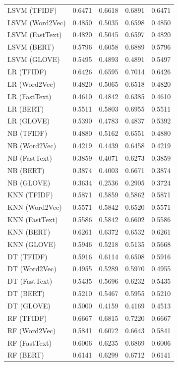 \begin{longtable}{|p{.40\linewidth}|p{.11\linewidth}|p{.11\linewidth}|p{.11\linewidth}|p{.11\linewidth}|}
LSVM (TFIDF) & 0.6471 & 0.6618 & 0.6891 & 0.6471 \\
LSVM (Word2Vec) & 0.4850 & 0.5035 & 0.6598 & 0.4850 \\
LSVM (FastText) & 0.4820 & 0.5045 & 0.6597 & 0.4820 \\
LSVM (BERT) & 0.5796 & 0.6058 & 0.6889 & 0.5796 \\
LSVM (GLOVE) & 0.5495 & 0.4893 & 0.4891 & 0.5497 \\
LR (TFIDF) & 0.6426 & 0.6595 & 0.7014 & 0.6426 \\
LR (Word2Vec) & 0.4820 & 0.5065 & 0.6518 & 0.4820 \\
LR (FastText) & 0.4610 & 0.4842 & 0.6385 & 0.4610 \\
LR (BERT) & 0.5511 & 0.5803 & 0.6955 & 0.5511 \\
LR (GLOVE) & 0.5390 & 0.4783 & 0.4837 & 0.5392 \\
NB (TFIDF) & 0.4880 & 0.5162 & 0.6551 & 0.4880 \\
NB (Word2Vec) & 0.4219 & 0.4439 & 0.6458 & 0.4219 \\
NB (FastText) & 0.3859 & 0.4071 & 0.6273 & 0.3859 \\
NB (BERT) & 0.3874 & 0.4003 & 0.6671 & 0.3874 \\
NB (GLOVE) & 0.3634 & 0.2536 & 0.2905 & 0.3724 \\
KNN (TFIDF) & 0.5871 & 0.5859 & 0.5862 & 0.5871 \\
KNN (Word2Vec) & 0.5571 & 0.5842 & 0.6520 & 0.5571 \\
KNN (FastText) & 0.5586 & 0.5842 & 0.6602 & 0.5586 \\
KNN (BERT) & 0.6261 & 0.6372 & 0.6532 & 0.6261 \\
KNN (GLOVE) & 0.5946 & 0.5218 & 0.5135 & 0.5668 \\
DT (TFIDF) & 0.5916 & 0.6114 & 0.6508 & 0.5916 \\
DT (Word2Vec) & 0.4955 & 0.5289 & 0.5970 & 0.4955 \\
DT (FastText) & 0.5435 & 0.5696 & 0.6232 & 0.5435 \\
DT (BERT) & 0.5210 & 0.5467 & 0.5955 & 0.5210 \\
DT (GLOVE) & 0.5000 & 0.4159 & 0.4169 & 0.4513 \\
RF (TFIDF) & 0.6667 & 0.6815 & 0.7220 & 0.6667 \\
RF (Word2Vec) & 0.5841 & 0.6072 & 0.6643 & 0.5841 \\
RF (FastText) & 0.6006 & 0.6235 & 0.6869 & 0.6006 \\
RF (BERT) & 0.6141 & 0.6299 & 0.6712 & 0.6141 \\

\end{longtable}
